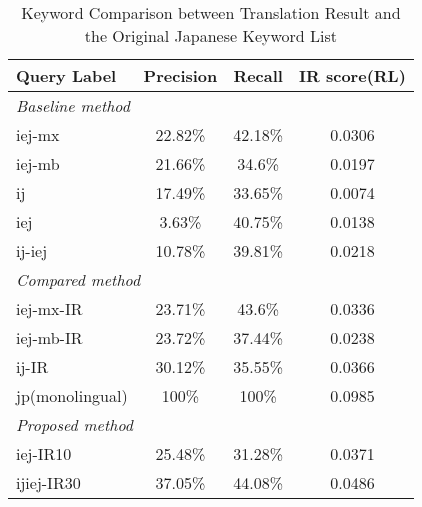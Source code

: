 \documentclass[english]{jnlp_1.3c}
\begin{document}
\begin{table}[t]
  \caption{Keyword Comparison between Translation Result and the
 Original Japanese Keyword List}
 \label{table:12}
 \begin{center}
    \begin{tabular}{|l|l||l|l|}\hline
     Query Label & \multicolumn{1}{c|}{Precision} &
     \multicolumn{1}{c|}{Recall} &  \multicolumn{1}{c|}{IR score(RL)} \\
     \hline
     \multicolumn{4}{|l|}{{\it Baseline method}} \\ \hline
     iej-mx & \multicolumn{1}{c|}{22.82\%} &
     \multicolumn{1}{c|}{42.18\%} &  \multicolumn{1}{c|}{0.0306} \\ \hline
     iej-mb & \multicolumn{1}{c|}{21.66\%} &
     \multicolumn{1}{c|}{34.6\%} &  \multicolumn{1}{c|}{0.0197} \\
     \hline
     ij& \multicolumn{1}{c|}{17.49\%} &
     \multicolumn{1}{c|}{33.65\%} &  \multicolumn{1}{c|}{0.0074} \\ \hline
     iej & \multicolumn{1}{c|}{3.63\%} &
     \multicolumn{1}{c|}{40.75\%} &  \multicolumn{1}{c|}{0.0138} \\ \hline
     ij-iej& \multicolumn{1}{c|}{10.78\%} &
     \multicolumn{1}{c|}{39.81\%} &  \multicolumn{1}{c|}{0.0218} \\ \hline
     \multicolumn{4}{|l|}{{\it Compared method}} \\ \hline
     iej-mx-IR & \multicolumn{1}{c|}{23.71\%} &
     \multicolumn{1}{c|}{43.6\%} &  \multicolumn{1}{c|}{0.0336} \\ \hline
     iej-mb-IR & \multicolumn{1}{c|}{23.72\%} &
     \multicolumn{1}{c|}{37.44\%} &  \multicolumn{1}{c|}{0.0238} \\
     \hline
     ij-IR & \multicolumn{1}{c|}{30.12\%} &
     \multicolumn{1}{c|}{35.55\%} &  \multicolumn{1}{c|}{0.0366} \\ \hline
     jp(monolingual)& \multicolumn{1}{c|}{100\%} &
     \multicolumn{1}{c|}{100\%} &  \multicolumn{1}{c|}{0.0985} \\ \hline
     \multicolumn{4}{|l|}{{\it Proposed method}} \\ \hline
     iej-IR10 & \multicolumn{1}{c|}{25.48\%} &
     \multicolumn{1}{c|}{31.28\%} &  \multicolumn{1}{c|}{0.0371} \\ \hline
     ijiej-IR30 & \multicolumn{1}{c|}{37.05\%} &
     \multicolumn{1}{c|}{44.08\%} &  \multicolumn{1}{c|}{0.0486} \\
     \hline
    \end{tabular}
 \end{center}
\end{table}
\end{document}
